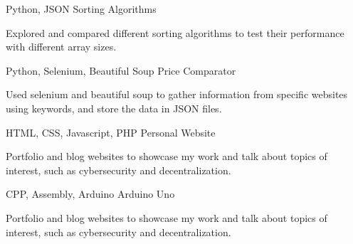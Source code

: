 

\begin{cventries}

      \cventry
        {Python, JSON} %
        {Sorting Algorithms} %
        {} %
        {} %
        {
          \begin{cvitems} %
            \item {Explored and compared different sorting algorithms to test their performance with different array sizes.}
          \end{cvitems}
        }

    \cventry
        {Python, Selenium, Beautiful Soup} %
        {Price Comparator} %
        {} %
        {} %
        {
        \begin{cvitems} %
            \item {Used selenium and beautiful soup to gather information from specific websites using keywords, and store the data in JSON files.}
        \end{cvitems}
        }

    \cventry
        {HTML, CSS, Javascript, PHP} %
        {Personal Website} %
        {} %
        {} %
        {
            \begin{cvitems} %
            \item {Portfolio and blog websites to showcase my work and talk about topics of interest, such as cybersecurity and decentralization.}
            \end{cvitems}
        }

    \cventry
      {CPP, Assembly, Arduino} %
      {Arduino Uno} %
      {} %
      {} %
      {
          \begin{cvitems} %
          \item {Portfolio and blog websites to showcase my work and talk about topics of interest, such as cybersecurity and decentralization.}
          \end{cvitems}
      }
    \end{cventries}
    